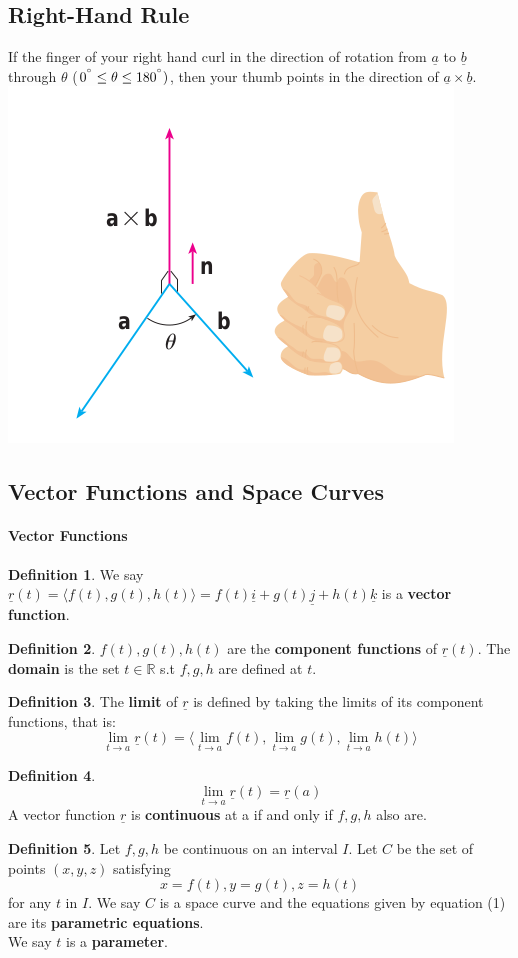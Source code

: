 \documentclass[12 pt]{article}
\theoremstyle{definition}
\newtheorem{defn}{Definition}
\begin{document}
\subsection{Right-Hand Rule} If the finger of your right hand curl in the direction of rotation from $\underline{a}$ to $\underline{b}$ through $\theta$ ($0^{\degree}\leq \theta \leq 180^{\degree})$, then your thumb points in the direction of $\underline{a} \times \underline{b}$.
\includegraphics[scale=0.4]{rhr}
\subsection{Vector Functions and Space Curves}
\paragraph{Vector Functions}
\begin{defn}
	We say $\underline{r}(t)=\langle f(t),g(t),h(t) \rangle =f(t)\underline{i}+g(t)\underline{j}+h(t)\underline{k}$ is a \textbf{vector function}.
\end{defn}
\begin{defn}
	$f(t),g(t),h(t)$ are the \textbf{component functions} of $\underline{r}(t)$. The \textbf{domain} is the set $t\in \mathbb{R}$ s.t $f,g,h$ are defined at $t$.
\end{defn}
\begin{defn}
	The \textbf{limit} of $\underline{r}$ is defined by taking the limits of its component functions, that is: $$\lim_{t\to a}\underline{r}(t)=\langle \lim_{t\to a} f(t),\lim_{t\to a}g(t),\lim_{t\to a}h(t) \rangle$$
\end{defn}
\begin{defn}
	$$\lim_{t \to a}\underline{r}(t)=\underline{r}(a)$$
	A vector function $\underline{r}$ is \textbf{continuous} at a if and only if $f,g,h$ also are.
\end{defn}
\begin{defn}
	Let $f,g,h$ be continuous on an interval $I$. Let $C$ be the set of points $(x,y,z)$ satisfying 
	\begin{equation}
		x=f(t),y=g(t),z=h(t)
	\end{equation}
	for any $t$ in $I$. We say $C$ is a space curve and the equations given by equation (1) are its \textbf{parametric equations}.
	\\ We say $t$ is a \textbf{parameter}.
\end{defn}
\end{document}
